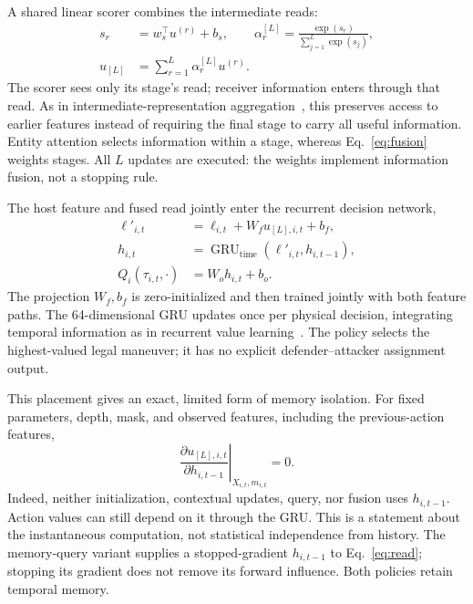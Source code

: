 A shared linear scorer combines the intermediate reads:
\begin{align}
 s_r&=w_s^\top u^{(r)}+b_s,\qquad
 \alpha_r^{[L]}=\frac{\exp(s_r)}{\sum_{j=1}^{L}\exp(s_j)},\nonumber\\
 u_{[L]}&=\sum_{r=1}^{L}\alpha_r^{[L]}u^{(r)}.
 \label{eq:fusion}
\end{align}
The scorer sees only its stage's read; receiver information enters through that read. As in intermediate-representation aggregation~\cite{xu2018jk}, this preserves access to earlier features instead of requiring the final stage to carry all useful information. Entity attention selects information within a stage, whereas Eq.~\eqref{eq:fusion} weights stages. All $L$ updates are executed: the weights implement information fusion, not a stopping rule.

The host feature and fused read jointly enter the recurrent decision network,
\begin{align}
 \ell'_{i,t}&=\ell_{i,t}+W_f u_{[L],i,t}+b_f,\nonumber\\
 h_{i,t}&=\operatorname{GRU}_{\mathrm{time}}(\ell'_{i,t},h_{i,t-1}),\nonumber\\
 Q_i(\tau_{i,t},\cdot)&=W_o h_{i,t}+b_o.
 \label{eq:decision}
\end{align}
The projection $W_f,b_f$ is zero-initialized and then trained jointly with both feature paths. The 64-dimensional GRU updates once per physical decision, integrating temporal information as in recurrent value learning~\cite{hausknecht2015drqn}. The policy selects the highest-valued legal maneuver; it has no explicit defender--attacker assignment output.

This placement gives an exact, limited form of memory isolation. For fixed parameters, depth, mask, and observed features, including the previous-action features,
\begin{equation}
 \left.\frac{\partial u_{[L],i,t}}{\partial h_{i,t-1}}\right|_{X_{i,t},m_{i,t}}=0.
 \label{eq:memory-isolation}
\end{equation}
Indeed, neither initialization, contextual updates, query, nor fusion uses $h_{i,t-1}$. Action values can still depend on it through the GRU. This is a statement about the instantaneous computation, not statistical independence from history. The memory-query variant supplies a stopped-gradient $h_{i,t-1}$ to Eq.~\eqref{eq:read}; stopping its gradient does not remove its forward influence. Both policies retain temporal memory.

